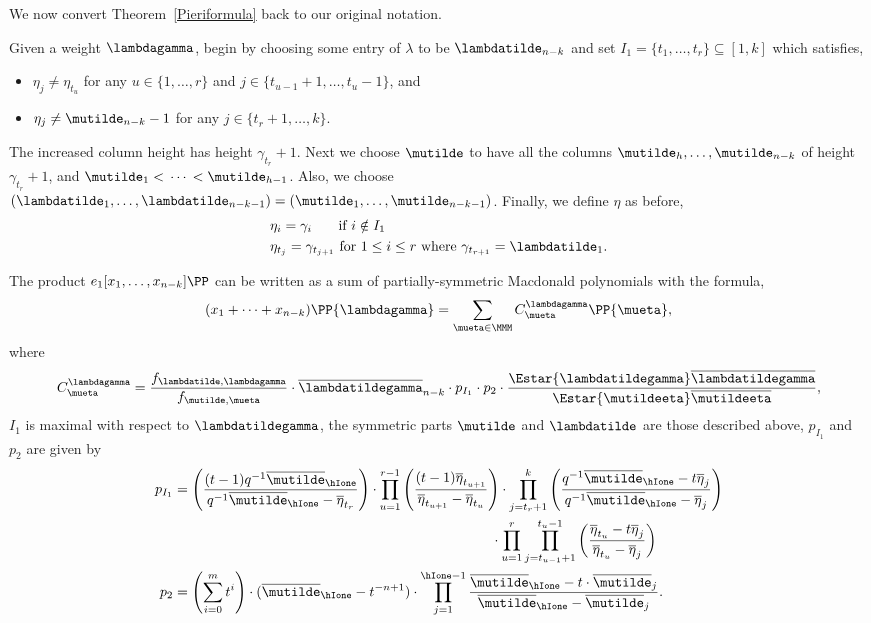 We now convert Theorem~\ref{Pieriformula} back to our original notation.

Given a weight $\lambdagamma$, begin by choosing some entry of $\lambda$ to be $\lambdatilde_{n-k}$ and set $I_1 = \{t_1, \dotsc, t_r\} \subseteq [1,k]$ which satisfies, 
\begin{itemize}
    \item $\eta_j \neq \eta_{t_u}$ for any $u \in \{1,\dotsc, r\}$ and $j \in \{t_{u-1}+1,\dotsc, t_{u}-1\}$, and
    \item $\eta_j \neq \mutilde_{n-k}-1$ for any $j \in \{t_r+1, \dotsc, k\}$.
\end{itemize}
The increased column height has height $\gamma_{t_r}+1$. Next we choose $\mutilde$ to have all the columns $\mutilde_{h} ,\dotsc, \mutilde_{n-k}$ of height $\gamma_{t_r}+1$, and $\mutilde_1 < \, \dotsm \, < \mutilde_{h-1}$. Also, we choose $(\lambdatilde_1, \dotsc, \lambdatilde_{n-k-1}) = (\mutilde_1, \dotsc, \mutilde_{n-k-1})$. Finally, we define $\eta$ as before,
 \begin{align}
     &\eta_i = \gamma_i \hspace*{.55cm}\text{ if } i\notin I_1\nonumber \\
     &\eta_{t_j}=\gamma_{t_{j+1}} \text{ for } 1\leq i \leq r \text{ where } \gamma_{t_{r+1}} = \lambdatilde_1.\label{eta}
 \end{align}

\begin{coro}\label{ourconventions}
 The product $e_1[x_1,\dotsc, x_{n-k}] \PP$ can be written as a sum of partially-symmetric Macdonald polynomials with the formula,
\[ (x_1 + \dotsm + x_{n-k})\PP{\lambdagamma} = \sum_{\mueta \in \MMM} C^{\lambdagamma}_{\mueta} \PP{\mueta},\]
where
\[C^{\lambdagamma}_{\mueta} = \frac{f_{\lambdatilde,\lambdagamma}}{f_{\mutilde,\mueta}} \cdot \overline{\lambdatildegamma}_{n-k} \cdot p_{I_1} \cdot p_{2}\cdot \frac{\Estar{\lambdatildegamma}\overline{\lambdatildegamma}}{\Estar{\mutildeeta}\overline{\mutildeeta}}, \]
$I_1$ is maximal with respect to $\lambdatildegamma$, the symmetric parts $\mutilde$ and $\lambdatilde$ are those described above, $p_{I_1}$ and $p_{2}$ are given by
\begin{align*}
p_{I_1} &= \left(\frac{(t-1)q^{-1} \overline{\mutilde}_{\hIone}}{q^{-1} \overline{\mutilde}_{\hIone}-\overline{\eta}_{t_r}}\right) \cdot \prod_{u=1}^{r-1} \left(\frac{(t-1) \overline{\eta}_{t_{u+1}}}{ \overline{\eta}_{t_{u+1}}-\overline{\eta}_{t_{u}}} \right) \cdot \prod_{j=t_r+1}^{k} \left( \frac{q^{-1} \overline{\mutilde}_{\hIone} - t \overline{\eta}_j}{q^{-1} \overline{\mutilde}_{\hIone} -  \overline{\eta}_j}\right) \\ & \hspace*{8cm} \cdot  \prod_{u=1}^{r} \prod_{j=t_{u-1}+1}^{t_{u}-1} \left( \frac{\overline{\eta}_{t_u} - t \overline{\eta}_j}{ \overline{\eta}_{t_{u}} -  \overline{\eta}_j} \right)\\
p_{2}&=\left( \sum_{i=0}^{m} t^i \right)\cdot (\overline{\mutilde}_{\hIone} - t^{-n+1}) \cdot \prod_{j=1}^{\hIone-1} \frac{\overline{\mutilde}_{\hIone} - t \cdot \overline{\mutilde}_j}{\overline{\mutilde}_{\hIone} - \overline{\mutilde}_j}.
\end{align*}
\end{coro}

